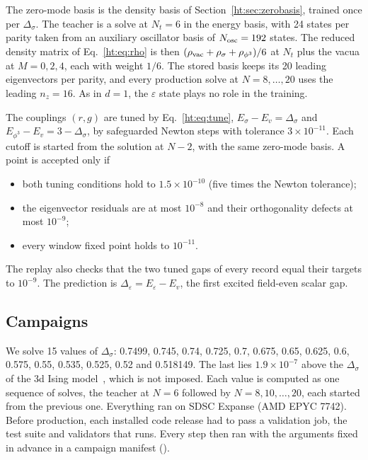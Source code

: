 The zero-mode basis is the density basis of Section~\ref{ht:sec:zerobasis}, trained once per $\Delta_\sigma$. The teacher
is a solve at $N_t=6$ in the energy basis, with 24 states per parity taken from an auxiliary oscillator basis of
$N_{\rm osc}=192$ states. The reduced density matrix of Eq.~\eqref{ht:eq:rho} is then
$(\rho_{\rm vac}+\rho_\sigma+\rho_{\phi^3})/6$ at $N_t$ plus the vacua at $M=0,2,4$, each with weight $1/6$. The stored
basis keeps its 20 leading eigenvectors per parity, and every production solve at $N=8,\dots,20$ uses the leading
$n_z=16$. %
As in $d=1$, the $\varepsilon$ state plays no role in the training.

The couplings $(r,g)$ are tuned by Eq.~\eqref{ht:eq:tune}, $E_\sigma-E_v=\Delta_\sigma$ and
$E_{\phi^3}-E_v=3-\Delta_\sigma$, by safeguarded Newton steps with tolerance $3\times10^{-11}$. Each cutoff is started
from the solution at $N-2$, with the same zero-mode basis. A point is accepted only if
\begin{itemize}
\item both tuning conditions hold to $1.5\times10^{-10}$ (five times the Newton tolerance);
\item the eigenvector residuals are at most $10^{-8}$ and their orthogonality defects at most $10^{-9}$;
\item every window fixed point holds to $10^{-11}$. %
\end{itemize}
The replay also checks that the two tuned gaps of every record equal their targets to $10^{-9}$. The prediction is
$\Delta_\varepsilon=E_\varepsilon-E_v$, the first excited field-even scalar gap.

\subsection{Campaigns}\label{ht:d3:campaigns}

We solve 15 values of $\Delta_\sigma$: 0.7499, 0.745, 0.74, 0.725, 0.7, 0.675, 0.65, 0.625, 0.6, 0.575, 0.55, 0.535,
0.525, 0.52 and 0.518149. The last lies $1.9\times10^{-7}$ above the $\Delta_\sigma$ of the 3d Ising
model~\cite{ht:Chang:2024whx}, which is not imposed. Each value is computed as one sequence of solves, the teacher at
$N=6$ followed by $N=8,10,\dots,20$, each started from the previous one. Everything ran on SDSC Expanse (AMD EPYC
7742). Before production, each installed code release had to pass a validation job, the test suite and validators
that  runs. Every step then ran with the arguments fixed in advance in a campaign manifest
().

